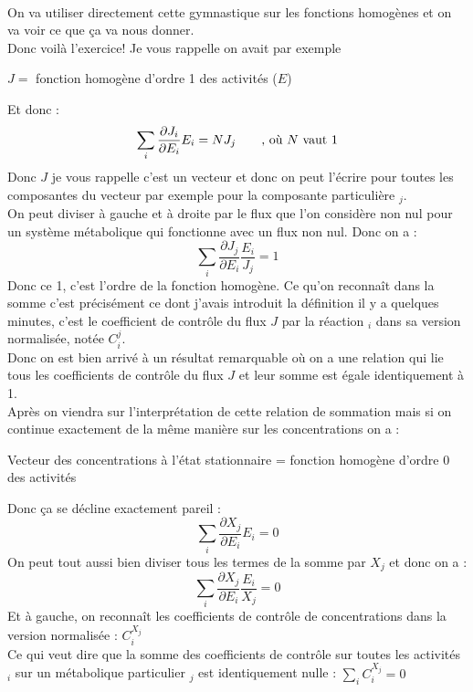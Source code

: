\paragraph{}On va utiliser directement cette gymnastique sur les fonctions homogènes et on va voir ce que ça va nous donner.\\
Donc voilà l'exercice! Je vous rappelle on avait par exemple\\
\begin{center}$J = $ fonction homogène d'ordre 1 des activités ($E$)\end{center}
Et donc :
$$\sum_{i}{\frac{\partial J_{i}}{\partial E_{i}}E_{i}=N J_{j}} \text{\qquad , où $N$ vaut 1}$$
Donc $J$ je vous rappelle c'est un vecteur et donc on peut l'écrire pour toutes les composantes du vecteur par exemple pour la composante particulière $_{j}$.\\
On peut diviser à gauche et à droite par le flux que l'on considère non nul pour un système métabolique qui fonctionne avec un flux non nul. Donc on a :
$$\sum_{i}{\frac{\partial J_{j}}{\partial E_{i}}\frac{E_{i}}{J_{j}} = 1}$$
Donc ce 1, c'est l'ordre de la fonction homogène. Ce qu'on reconnaît dans la somme c'est précisément ce dont j'avais introduit la définition il y a quelques minutes, c'est le coefficient de contrôle du flux $J$ par la réaction $_{i}$ dans sa version normalisée, notée $C_{i}^{j}$.\\
Donc on est bien arrivé à un résultat remarquable où on a une relation qui lie tous les coefficients de contrôle du flux $J$ et leur somme est égale identiquement à 1.\\
Après on viendra sur l'interprétation de cette relation de sommation mais si on continue exactement de la même manière sur les concentrations on a :

\begin{center} Vecteur des concentrations à l'état stationnaire = fonction homogène d'ordre 0 des activités
\end{center}

Donc ça se décline exactement pareil :
$$\sum_{i}{\frac{\partial X_{j}}{\partial E_{i}}E_{i} = 0}$$
On peut tout aussi bien diviser tous les termes de la somme par $X_{j}$ et donc on a :
$$\sum_{i}{\frac{\partial X_{j}}{\partial E_{i}}\frac{E_{i}}{X_{j}} = 0}$$
Et à gauche, on reconnaît les coefficients de contrôle de concentrations dans la version normalisée : $C_{i}^{X_{j}}$\\
Ce qui veut dire que la somme des coefficients de contrôle sur toutes les activités $_{i}$ sur un métabolique particulier $_{j}$ est identiquement nulle : $\sum_{i}{C_{i}^{X_{j}}}=0$\\

